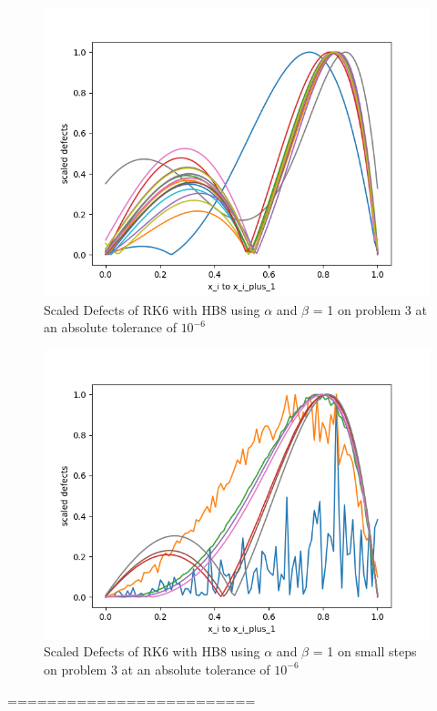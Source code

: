 \documentclass{article}
\begin{document}
\begin{figure}[H]
\centering
\includegraphics[width=0.7\linewidth]{./figures/static_alpha_rk6_with_hb8_p3_scaled_defects}
\caption{Scaled Defects of RK6 with HB8 using $\alpha$ and $\beta$ = 1 on problem 3 at an absolute tolerance of $10^{-6}$}
\label{fig:static_alpha_rk6_with_hb8_p3_scaled_defects}
\end{figure}

\begin{figure}[H]
\centering
\includegraphics[width=0.7\linewidth]{./figures/static_alpha_rk6_with_hb8_p3_scaled_defects_small_steps}
\caption{Scaled Defects of RK6 with HB8 using $\alpha$ and $\beta$ = 1 on small steps on problem 3 at an absolute tolerance of $10^{-6}$}
\label{fig:static_alpha_rk6_with_hb8_p3_scaled_defects_small_steps}
\end{figure}

=========================
\end{document}
